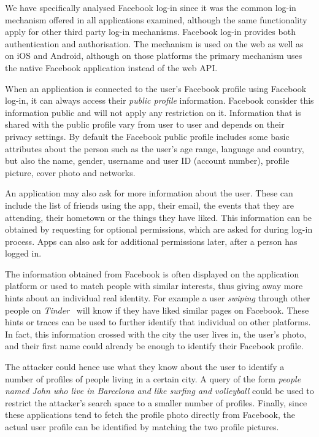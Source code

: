 We have specifically analysed Facebook log-in since it was the common log-in mechanism offered in all applications examined, although the same functionality apply for other third party log-in mechanisms. Facebook log-in provides both authentication and authorisation. The mechanism is used on the web as well as on iOS and Android, although on those platforms the primary mechanism uses the native Facebook application instead of the web API.

When an application is connected to the user's Facebook profile using Facebook log-in, it can always access their \emph{public profile} information. Facebook consider this information public and will not apply any restriction on it. Information that is shared with the public profile vary from user to user and depends on their privacy settings. By default the Facebook public profile includes some basic attributes about the person such as the user's age range, language and country, but also the name, gender, username and user ID (account number), profile picture, cover photo and networks.

An application may also ask for more information about the user. These can include the list of friends using the app, their email, the events that they are attending, their hometown or the things they have liked. This information can be obtained by requesting for optional permissions, which are asked for during log-in process. Apps can also ask for additional permissions later, after a person has logged in.

The information obtained from Facebook is often displayed on the application platform or used to match people with similar interests, thus giving away more hints about an individual real identity. For example a user \emph{swiping} through other people on \emph{Tinder}~\cite{tinder} will know if they have liked similar pages on Facebook.
These hints or traces can be used to further identify that individual on other platforms. In fact, this information crossed with the city the user lives in, the user's photo, and their first name could already be enough to identify their Facebook profile.

The attacker could hence use what they know about the user to identify a number of profiles of people living in a certain city. A query of the form \emph{people named John who live in Barcelona and like surfing and volleyball} could be used to restrict the attacker's search space to a smaller number of profiles. Finally, since these applications tend to fetch  the profile photo directly from Facebook, the actual user profile can be identified by matching the two profile pictures.

